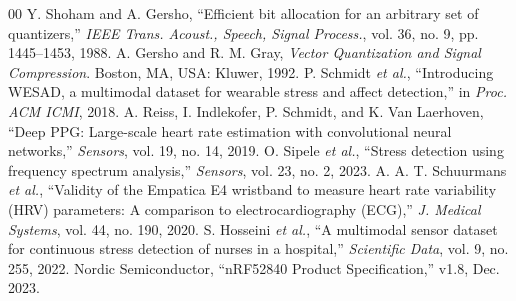 \documentclass[journal,twoside,web]{ieeecolor}
\begin{document}
\begin{thebibliography}{00}
 Y. Shoham and A. Gersho, ``Efficient bit allocation for an arbitrary set of quantizers,'' \emph{IEEE Trans. Acoust., Speech, Signal Process.}, vol. 36, no. 9, pp. 1445--1453, 1988.
 A. Gersho and R. M. Gray, \emph{Vector Quantization and Signal Compression}. Boston, MA, USA: Kluwer, 1992.
 P. Schmidt \emph{et al.}, ``Introducing WESAD, a multimodal dataset for wearable stress and affect detection,'' in \emph{Proc. ACM ICMI}, 2018.
 A. Reiss, I. Indlekofer, P. Schmidt, and K. Van Laerhoven, ``Deep PPG: Large-scale heart rate estimation with convolutional neural networks,'' \emph{Sensors}, vol. 19, no. 14, 2019.
 O. Sipele \emph{et al.}, ``Stress detection using frequency spectrum analysis,'' \emph{Sensors}, vol. 23, no. 2, 2023.
 A. A. T. Schuurmans \emph{et al.}, ``Validity of the Empatica E4 wristband to measure heart rate variability (HRV) parameters: A comparison to electrocardiography (ECG),'' \emph{J. Medical Systems}, vol. 44, no. 190, 2020.
 S. Hosseini \emph{et al.}, ``A multimodal sensor dataset for continuous stress detection of nurses in a hospital,'' \emph{Scientific Data}, vol. 9, no. 255, 2022.
 Nordic Semiconductor, ``nRF52840 Product Specification,'' v1.8, Dec. 2023.
\end{thebibliography}
\end{document}
